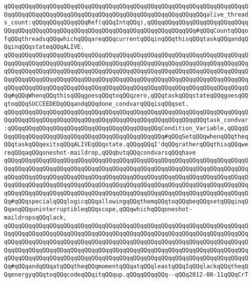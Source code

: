 \newline
\verb|qQQqqQQqqQQqqQQqqQQqqQQqqQQqqQQqqQQqqQQqqQQqqQQqqQQqqQQqqQQqqQQqqQQqqQQqqQQqqQQqqQQqqQQqqQQqqQQqqQQqqQQqqQQqqQQqqQQqqQQqqQQqqQQqalive_threads_count:qQQqqQQqqQQqqQQqRef(qQQqIntqQQq),qQQqqQQqqQQqqQQqqQQqqQQqqQQqqQQqqQQqqQQqqQQqqQQqqQQqqQQqqQQqqQQqqQQqqQQqqQQqqQQqqQQq#qQQqCountqQQqofqQQqthreadsqQQqwhichqQQqareqQQqcurrentqQQqinqQQqthisqQQqtaskqQQqandqQQqinqQQqstateqQQqALIVE.|\newline
\verb|qQQqqQQqqQQqqQQqqQQqqQQqqQQqqQQqqQQqqQQqqQQqqQQqqQQqqQQqqQQqqQQqqQQqqQQqqQQqqQQqqQQqqQQqqQQqqQQqqQQqqQQqqQQqqQQqqQQqqQQqqQQqqQQqqQQqqQQqqQQqqQQqqQQqqQQqqQQqqQQqqQQqqQQqqQQqqQQqqQQqqQQqqQQqqQQqqQQqqQQqqQQqqQQqqQQqqQQqqQQqqQQqqQQqqQQqqQQqqQQqqQQqqQQqqQQqqQQqqQQqqQQqqQQqqQQqqQQqqQQqqQQqqQQqqQQqqQQqqQQqqQQqqQQqqQQqqQQqqQQqqQQqqQQqqQQqqQQqqQQqqQQqqQQqqQQq#qQQqWhenqQQqthisqQQqgoesqQQqtoqQQqzero,qQQqtaskqQQqstateqQQqgoesqQQqtoqQQqSUCCEEDEDqQQqandqQQqdone_condvarqQQqisqQQqset.|\newline
\newline
\verb|qQQqqQQqqQQqqQQqqQQqqQQqqQQqqQQqqQQqqQQqqQQqqQQqqQQqqQQqqQQqqQQqqQQqqQQqqQQqqQQqqQQqqQQqqQQqqQQqqQQqqQQqqQQqqQQqqQQqqQQqqQQqqQQqtask_condvar:qQQqqQQqqQQqqQQqqQQqqQQqqQQqqQQqqQQqqQQqqQQqCondition_Variable,qQQqqQQqqQQqqQQqqQQqqQQqqQQqqQQqqQQqqQQqqQQqqQQqqQQq#qQQqSetqQQqwhenqQQqtheqQQqtaskqQQqexitsqQQqALIVEqQQqstate.qQQqqQQqI'dqQQqratherqQQqthisqQQqwereqQQqaqQQqoneshot-maildrop,qQQqbutqQQqcondvarsqQQqhave|\newline
\verb|qQQqqQQqqQQqqQQqqQQqqQQqqQQqqQQqqQQqqQQqqQQqqQQqqQQqqQQqqQQqqQQqqQQqqQQqqQQqqQQqqQQqqQQqqQQqqQQqqQQqqQQqqQQqqQQqqQQqqQQqqQQqqQQqqQQqqQQqqQQqqQQqqQQqqQQqqQQqqQQqqQQqqQQqqQQqqQQqqQQqqQQqqQQqqQQqqQQqqQQqqQQqqQQqqQQqqQQqqQQqqQQqqQQqqQQqqQQqqQQqqQQqqQQqqQQqqQQqqQQqqQQqqQQqqQQqqQQqqQQqqQQqqQQqqQQqqQQqqQQqqQQqqQQqqQQqqQQqqQQqqQQqqQQqqQQqqQQqqQQqqQQqqQQqqQQq#qQQqspecialqQQqlogicqQQqallowingqQQqthemqQQqtoqQQqbeqQQqsetqQQqinqQQqanqQQquninterruptibleqQQqscope,qQQqwhichqQQqoneshot-maildropsqQQqlack,|\newline
\verb|qQQqqQQqqQQqqQQqqQQqqQQqqQQqqQQqqQQqqQQqqQQqqQQqqQQqqQQqqQQqqQQqqQQqqQQqqQQqqQQqqQQqqQQqqQQqqQQqqQQqqQQqqQQqqQQqqQQqqQQqqQQqqQQqqQQqqQQqqQQqqQQqqQQqqQQqqQQqqQQqqQQqqQQqqQQqqQQqqQQqqQQqqQQqqQQqqQQqqQQqqQQqqQQqqQQqqQQqqQQqqQQqqQQqqQQqqQQqqQQqqQQqqQQqqQQqqQQqqQQqqQQqqQQqqQQqqQQqqQQqqQQqqQQqqQQqqQQqqQQqqQQqqQQqqQQqqQQqqQQqqQQqqQQqqQQqqQQqqQQqqQQqqQQqqQQq#qQQqandqQQqatqQQqtheqQQqmomentqQQqatqQQqleastqQQqIqQQqlackqQQqtheqQQqenergyqQQqtoqQQqcodeqQQqitqQQqup.qQQqqQQqqQQq--qQQq2012-08-11qQQqCrT|\newline
